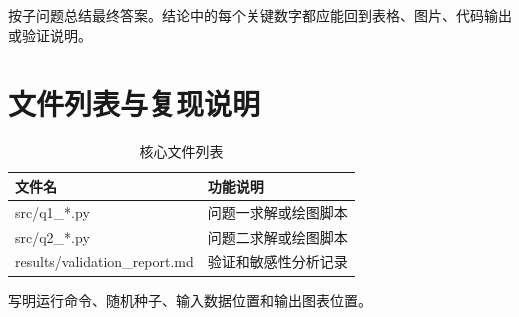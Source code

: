 \documentclass[12pt,a4paper]{ctexart}
\begin{document}
按子问题总结最终答案。结论中的每个关键数字都应能回到表格、图片、代码输出或验证说明。




\appendix

\section{文件列表与复现说明}

\begin{table}[H]
\centering
\caption{核心文件列表}
\begin{tabularx}{\textwidth}{LL}
\toprule
文件名 & 功能说明 \\
\midrule
src/q1\_*.py & 问题一求解或绘图脚本 \\
src/q2\_*.py & 问题二求解或绘图脚本 \\
results/validation\_report.md & 验证和敏感性分析记录 \\
\bottomrule
\end{tabularx}
\end{table}

写明运行命令、随机种子、输入数据位置和输出图表位置。
\end{document}
